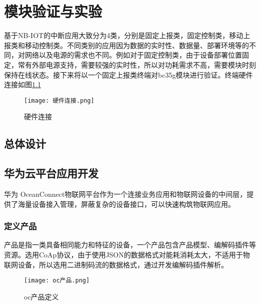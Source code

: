 



\chapter{模块验证与实验}
基于NB-IOT的中断应用大致分为4类，分别是固定上报类，固定控制类，移动上报类和移动控制类。不同类别的应用因为数据的实时性、数据量、部署环境等的不同，对网络以及电源的需求也不同。例如对于固定控制类，由于设备部署位置固定，常有外部电源支持，需要较强的实时性，所以对功耗需求不高，需要模块时刻保持在线状态。接下来将以一个固定上报类终端对bc35g模块进行验证。终端硬件连接如图\ref{硬件连接}
\begin{figure}[h]
    \centering
  	\texttt{[image: 硬件连接.png]}
	\caption{硬件连接}
	\label{硬件连接}
\end{figure}

\section{总体设计}


\section{华为云平台应用开发}
华为 OceanConnect物联网平台作为一个连接业务应用和物联网设备的中间层，提供了海量设备接入管理，屏蔽复杂的设备接口，可以快速构筑物联网应用。

\subsection{定义产品}
产品是指一类具备相同能力和特征的设备，一个产品包含产品模型、编解码插件等资源。选用CoAp协议，由于使用JSON的数据格式对能耗消耗太大，不适用于物联网设备，所以选用二进制码流的数据格式，通过开发编解码插件解析。
\begin{figure}[H]
    \centering
	\texttt{[image: oc产品.png]}
	\caption{oc产品定义}
	\label{oc产品}
\end{figure}


